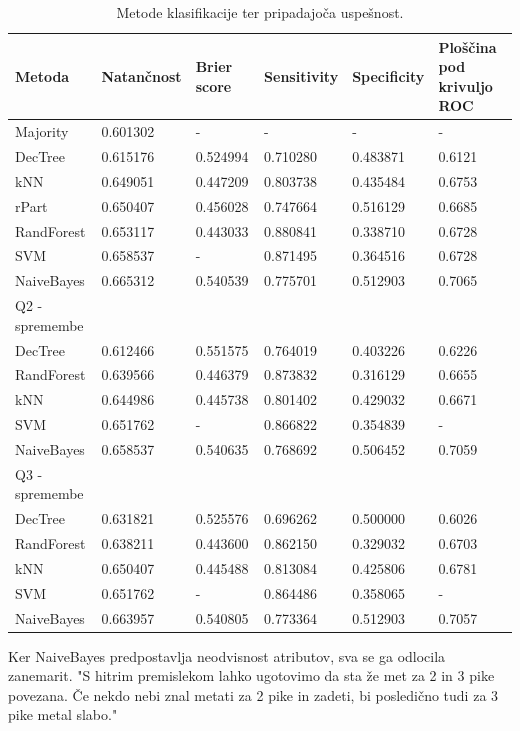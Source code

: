 \documentclass[a4paper,11pt]{article}
\begin{document}
\begin{table}[H]
\caption{Metode klasifikacije ter pripadajoča uspešnost.}
\label{tab1}
\begin{center}
\begin{tabular}{lllllp{3cm}}
\hline
Metoda & Natančnost & Brier score & Sensitivity & Specificity & Ploščina pod krivuljo ROC\\
\hline
Majority & 0.601302 & - & - & - & - \\
\hline
DecTree & 0.615176 & 0.524994 & 0.710280 & 0.483871 & 0.6121 \\
kNN & 0.649051 & 0.447209 & 0.803738 & 0.435484 & 0.6753 \\
rPart & 0.650407 & 0.456028 & 0.747664 & 0.516129 & 0.6685 \\
RandForest & 0.653117 & 0.443033 & 0.880841 & 0.338710 & 0.6728 \\
SVM & 0.658537 & - & 0.871495 & 0.364516 & 0.6728 \\
NaiveBayes & 0.665312 & 0.540539 & 0.775701 & 0.512903 & 0.7065 \\
\hline
Q2	-  spremembe \\
\hline
DecTree & 0.612466 & 0.551575 & 0.764019 & 0.403226 & 0.6226 \\
RandForest & 0.639566 & 0.446379 & 0.873832 & 0.316129 & 0.6655 \\
kNN & 0.644986 & 0.445738 & 0.801402 & 0.429032 & 0.6671 \\
SVM & 0.651762 & - & 0.866822 & 0.354839 & - \\
NaiveBayes & 0.658537 & 0.540635 & 0.768692 & 0.506452 & 0.7059 \\
\hline
Q3	-  spremembe \\
\hline
DecTree & 0.631821 & 0.525576 & 0.696262 & 0.500000 & 0.6026 \\
RandForest & 0.638211 & 0.443600 & 0.862150 & 0.329032 & 0.6703 \\
kNN & 0.650407 & 0.445488 & 0.813084 & 0.425806 & 0.6781 \\
SVM & 0.651762 & - & 0.864486 & 0.358065 & - \\
NaiveBayes & 0.663957 & 0.540805 & 0.773364 & 0.512903 & 0.7057 \\
\hline
\end{tabular}
\end{center}
\end{table}

Ker NaiveBayes predpostavlja neodvisnost atributov, sva se ga odlocila zanemarit.
"S hitrim premislekom lahko ugotovimo da sta že met za 2 in 3 pike povezana. Če nekdo 
nebi znal metati za 2 pike in zadeti, bi posledično tudi za 3 pike metal slabo."
\end{document}
